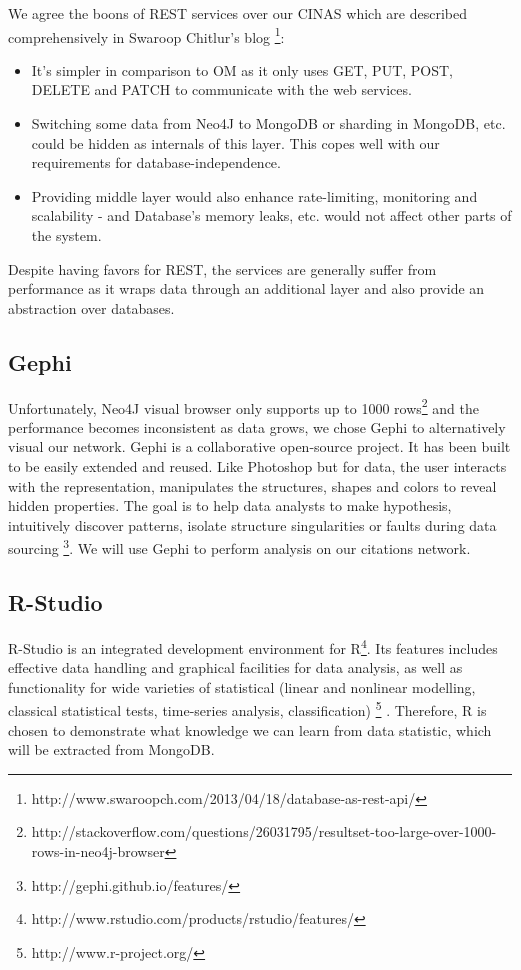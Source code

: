 \documentclass{sig-alternate}
\begin{document}
{We agree the boons of REST services over our CINAS which are described comprehensively in Swaroop Chitlur's blog \footnote{http://www.swaroopch.com/2013/04/18/database-as-rest-api/}:
\begin{itemize}
\item It's simpler in comparison to OM as it only uses GET, PUT, POST, DELETE and PATCH to communicate with the web services.
\item  Switching some data from Neo4J to MongoDB or sharding in MongoDB, etc. could be hidden as internals of this layer. This copes well with our requirements for database-independence.
\item Providing middle layer would also enhance rate-limiting, monitoring and scalability - and Database's memory leaks, etc. would not affect other parts of the system.
\end{itemize}

Despite having favors for REST, the services are generally suffer from performance as it wraps data through an additional layer and also provide an abstraction over databases.
\subsection{Gephi}
Unfortunately, Neo4J visual browser only supports up to 1000 rows\footnote{http://stackoverflow.com/questions/26031795/resultset-too-large-over-1000-rows-in-neo4j-browser} and the performance becomes inconsistent as data grows, we chose Gephi to alternatively visual our network. Gephi is a collaborative open-source project. It has been built to be easily extended and reused. Like Photoshop but for data, the user interacts with the representation, manipulates the structures, shapes and colors to reveal hidden properties. The goal is to help data analysts to make hypothesis, intuitively discover patterns, isolate structure singularities or faults during data sourcing \footnote{http://gephi.github.io/features/}. We will use Gephi to perform analysis on our citations network.

\subsection{R-Studio}

R-Studio is an integrated development  environment for R\footnote{http://www.rstudio.com/products/rstudio/features/}. Its features includes effective data handling and graphical facilities for data analysis, as well as functionality for wide varieties of statistical (linear and nonlinear modelling, classical statistical tests, time-series analysis, classification) \footnote{http://www.r-project.org/} . Therefore, R is chosen to demonstrate what knowledge we can learn from data statistic, which will be extracted from MongoDB.

}
\end{document}
